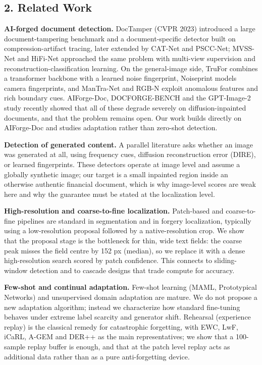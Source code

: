 \subsection{2. Related Work}\label{related-work}

\textbf{AI-forged document detection.} DocTamper (CVPR 2023) introduced a large document-tampering benchmark and a document-specific detector built on compression-artifact tracing, later extended by CAT-Net and PSCC-Net; MVSS-Net and HiFi-Net approached the same problem with multi-view supervision and reconstruction-classification learning. On the general-image side, TruFor combines a transformer backbone with a learned noise fingerprint, Noiseprint models camera fingerprints, and ManTra-Net and RGB-N exploit anomalous features and rich boundary cues. AIForge-Doc, DOCFORGE-BENCH and the GPT-Image-2 study recently showed that all of these degrade severely on diffusion-inpainted documents, and that the problem remains open. Our work builds directly on AIForge-Doc and studies adaptation rather than zero-shot detection.

\textbf{Detection of generated content.} A parallel literature asks whether an image was generated at all, using frequency cues, diffusion reconstruction error (DIRE), or learned fingerprints. These detectors operate at image level and assume a globally synthetic image; our target is a small inpainted region inside an otherwise authentic financial document, which is why image-level scores are weak here and why the guarantee must be stated at the localization level.

\textbf{High-resolution and coarse-to-fine localization.} Patch-based and coarse-to-fine pipelines are standard in segmentation and in forgery localization, typically using a low-resolution proposal followed by a native-resolution crop. We show that the proposal stage is the bottleneck for thin, wide text fields: the coarse peak misses the field centre by 152 px (median), so we replace it with a dense high-resolution search scored by patch confidence. This connects to sliding-window detection and to cascade designs that trade compute for accuracy.

\textbf{Few-shot and continual adaptation.} Few-shot learning (MAML, Prototypical Networks) and unsupervised domain adaptation are mature. We do not propose a new adaptation algorithm; instead we characterize how standard fine-tuning behaves under extreme label scarcity and generator shift. Rehearsal (experience replay) is the classical remedy for catastrophic forgetting, with EWC, LwF, iCaRL, A-GEM and DER++ as the main representatives; we show that a 100-sample replay buffer is enough, and that at the patch level replay acts as additional data rather than as a pure anti-forgetting device.

